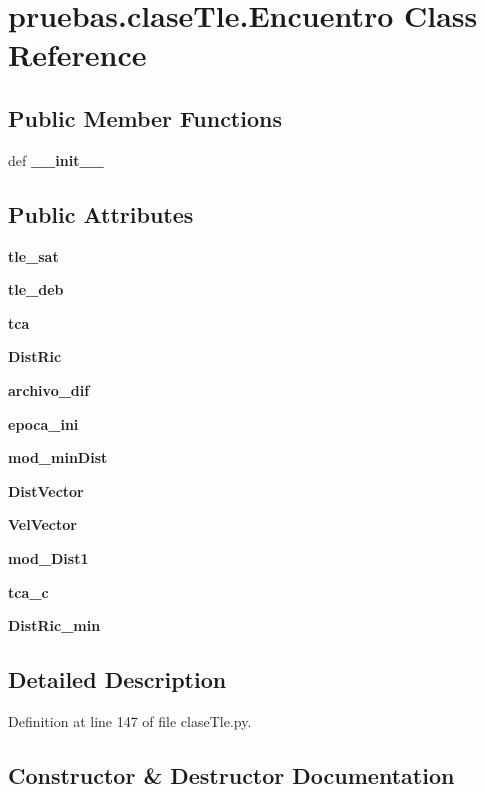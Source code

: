 \section{pruebas.\-clase\-Tle.\-Encuentro \-Class \-Reference}
\label{classpruebas_1_1clase_tle_1_1_encuentro}
\subsection*{\-Public \-Member \-Functions}
\begin{DoxyCompactItemize}
\item 
def {\bf \-\_\-\-\_\-init\-\_\-\-\_\-}
\end{DoxyCompactItemize}
\subsection*{\-Public \-Attributes}
\begin{DoxyCompactItemize}
\item 
{\bf tle\-\_\-sat}
\item 
{\bf tle\-\_\-deb}
\item 
{\bf tca}
\item 
{\bf \-Dist\-Ric}
\item 
{\bf archivo\-\_\-dif}
\item 
{\bf epoca\-\_\-ini}
\item 
{\bf mod\-\_\-min\-Dist}
\item 
{\bf \-Dist\-Vector}
\item 
{\bf \-Vel\-Vector}
\item 
{\bf mod\-\_\-\-Dist1}
\item 
{\bf tca\-\_\-c}
\item 
{\bf \-Dist\-Ric\-\_\-min}
\end{DoxyCompactItemize}


\subsection{\-Detailed \-Description}


\-Definition at line 147 of file clase\-Tle.\-py.



\subsection{\-Constructor \& \-Destructor \-Documentation}
